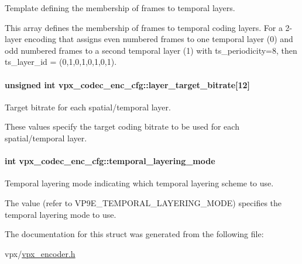 Template defining the membership of frames to temporal layers. 

This array defines the membership of frames to temporal coding layers. For a 2-\/layer encoding that assigns even numbered frames to one temporal layer (0) and odd numbered frames to a second temporal layer (1) with ts\+\_\+periodicity=8, then ts\+\_\+layer\+\_\+id = (0,1,0,1,0,1,0,1). 
\paragraph[{\texorpdfstring{layer\+\_\+target\+\_\+bitrate}{layer_target_bitrate}}]{\setlength{\rightskip}{0pt plus 5cm}unsigned int vpx\+\_\+codec\+\_\+enc\+\_\+cfg\+::layer\+\_\+target\+\_\+bitrate\mbox{[}12\mbox{]}}\hypertarget{structvpx__codec__enc__cfg_a3f6b4c8aea7a713c51ad5d44e3552b1f}{}\label{structvpx__codec__enc__cfg_a3f6b4c8aea7a713c51ad5d44e3552b1f}


Target bitrate for each spatial/temporal layer. 

These values specify the target coding bitrate to be used for each spatial/temporal layer. 
\paragraph[{\texorpdfstring{temporal\+\_\+layering\+\_\+mode}{temporal_layering_mode}}]{\setlength{\rightskip}{0pt plus 5cm}int vpx\+\_\+codec\+\_\+enc\+\_\+cfg\+::temporal\+\_\+layering\+\_\+mode}\hypertarget{structvpx__codec__enc__cfg_a07c78dd29423d5ab475b9d77a0107d16}{}\label{structvpx__codec__enc__cfg_a07c78dd29423d5ab475b9d77a0107d16}


Temporal layering mode indicating which temporal layering scheme to use. 

The value (refer to V\+P9\+E\+\_\+\+T\+E\+M\+P\+O\+R\+A\+L\+\_\+\+L\+A\+Y\+E\+R\+I\+N\+G\+\_\+\+M\+O\+DE) specifies the temporal layering mode to use. 

The documentation for this struct was generated from the following file\+:\begin{DoxyCompactItemize}
\item 
vpx/\hyperlink{vpx__encoder_8h}{vpx\+\_\+encoder.\+h}\end{DoxyCompactItemize}
